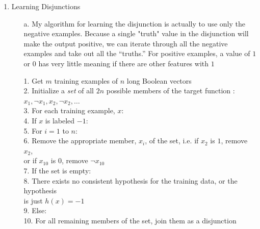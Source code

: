 
\usepackage{graphicx}

\oddsidemargin 0in
\evensidemargin 0in
\textwidth 6.5in
\topmargin -0.5in
\textheight 9.0in
\newcommand{\norm}[1]{\left\lVert #1 \right\rVert}



\pagestyle{myheadings}

\begin{enumerate}
\item Learning Disjunctions
      	\begin{enumerate}\parindent-4pt
		\item[a.]
			My algorithm for learning the disjunction is actually to use only the negative examples. Because a single "truth" value in the disjunction will make the output positive, we can iterate through all the negative examples and take out all the ``truths.'' For positive examples, a value of $1$ or $0$ has very little meaning if there are other features with $1$ 
			\begin{algorithm}
				1. Get $m$ training examples of $n$ long Boolean vectors\\
				2. Initialize a \textit{set} of all $2n$ possible members of the target function : $x_1, \neg x_1, x_2, \neg x_2, \ldots$ \\
				3. For each training example, $x$:\\
				4. \>\> If $x$ is labeled $-1$:\\
				5. \>\>\>	For $i=1$ to $n$:\\
				6. \>\>\>\>		Remove the appropriate member, $x_i$, of the set, i.e. if $x_2$ is $1$, remove $x_2$,\\ 
				   \>\>\>\>		or if $x_{10}$ is $0$, remove $\neg x_{10}$\\
				7. If the set is empty:\\
				8. \>\>	There exists no consistent hypothesis for the training data, or the hypothesis\\
                                   \>\> is just $h(x)=-1$\\
				9. Else:\\
				10.\>\> For all remaining members of the set, join them as a disjunction\\
			\end{algorithm}
				

\end{enumerate}
\end{enumerate}
